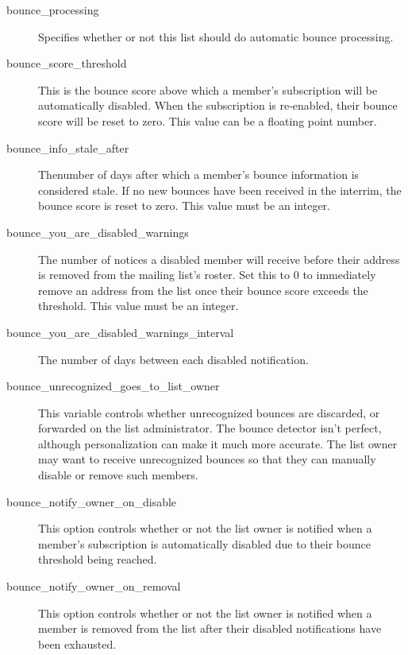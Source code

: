 \documentclass{howto}
\begin{document}
\begin{description}

\item[bounce_processing]
    Specifies whether or not this list should do automatic bounce
    processing.

\item[bounce_score_threshold]
    This is the bounce score above which a member's subscription will
    be automatically disabled.  When the subscription is re-enabled,
    their bounce score will be reset to zero.  This value can be a
    floating point number.

\item[bounce_info_stale_after]
    Thenumber of days after which a member's bounce information is
    considered stale.  If no new bounces have been received in the
    interrim, the bounce score is reset to zero.  This value must be
    an integer.

\item[bounce_you_are_disabled_warnings]
    The number of notices a disabled member will receive before their
    address is removed from the mailing list's roster.  Set this to 0
    to immediately remove an address from the list once their bounce
    score exceeds the threshold.  This value must be an integer.

\item[bounce_you_are_disabled_warnings_interval]
    The number of days between each disabled notification.

\item[bounce_unrecognized_goes_to_list_owner]
    This variable controls whether unrecognized bounces are discarded,
    or forwarded on the list administrator.  The bounce detector isn't
    perfect, although personalization can make it much more accurate.
    The list owner may want to receive unrecognized bounces so that
    they can manually disable or remove such members.

\item[bounce_notify_owner_on_disable]
    This option controls whether or not the list owner is notified
    when a member's subscription is automatically disabled due to
    their bounce threshold being reached.

\item[bounce_notify_owner_on_removal]
    This option controls whether or not the list owner is notified
    when a member is removed from the list after their disabled
    notifications have been exhausted.
\end{description}
\end{document}
